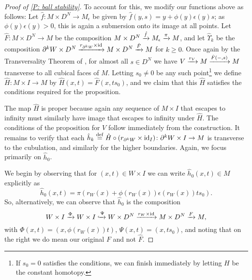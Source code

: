\begin{proof}[Proof of \cref{P: ball stability}]
	To account for this, we modify our functions above as follows: Let $\hat f \colon M \times D^N \to M_\epsilon$ be given by $\hat f(y, s) = y +\phi(y) \epsilon(y) s$; as $\phi(y)\epsilon(y)>0$, this is again a submersion onto its image at all points.
	Let $\hat F \colon M \times D^N \to M$ be the composition $M \times D^N \xrightarrow{\hat f}M_\epsilon \xrightarrow{\pi}M$, and let $\hat \Upsilon_k$ be the composition $\partial^kW \times D^N \xrightarrow{r_{\partial^kW} \times \mathrm{id}}M \times D^N \xrightarrow{\hat F} M$ for $k\geq 0$.
	Once again by the Transversality Theorem of \cite[Section 2.3]{GuPo74}, for almost all $s \in D^N$ we have $V \xrightarrow{r_V} M \xrightarrow{\hat F(-,s)} M$ transverse to all cubical faces of $M$.
	Letting $s_0 \neq 0$ be any such point\footnote{If $s_0 = 0$ satisfies the conditions, we can finish immediately by letting $H$ be the constant homotopy.} we define $\hat H \colon M \times I \to M$ by $\hat H(x,t) = \hat F(x,ts_0)$, and we claim that this $\hat H$ satisfies the conditions required for the proposition.

	The map $\hat H$ is proper because again any sequence of $M \times I$ that escapes to infinity must similarly have image that escapes to infinity under $\hat H$.
	The conditions of the proposition for $V$ follow immediately from the construction.
	It remains to verify that each $\hat h_k \stackrel{\mathrm{def}}{=} \hat H \circ (r_{\partial^k W} \times \mathrm{id}_I) \colon \partial^k W \times I \to M$ is transverse to the cubulation, and similarly for the higher boundaries.
	Again, we focus primarily on $\hat h_0$.

	\begin{comment}
	Note: we are not claiming an analogue of the third condition above holds for $\hat F$, nor do we need to.
	As we already know from the second condition of the proposition that $\hat h(-,1)$ is transverse to the cubulation and from the hypotheses that $\hat h(-,0)$ is transverse to the cubulation on $W$, it suffices to demonstrated transversality to the cubulation on the restriction of $\hat h$ to $W \times (0,1)$.
	\end{comment}

	We begin by observing that for $(x,t) \in W \times I$ we can write $\hat h_0(x,t) \in M$ explicitly as
	$$\hat h_0(x,t) = \pi(r_W(x)+\phi(r_W(x))\epsilon(r_W(x))ts_0).$$
	So, alternatively, we can observe that $\hat h_0$ is the composition
	\begin{equation}\label{E: alt hat h}
		W \times I \xrightarrow{\Phi} W \times I \xhookrightarrow{\Psi} W \times D^N \xrightarrow{r_W \times \mathrm{id}} M \times D^N \xrightarrow{F} M,
	\end{equation}
	with $\Phi(x,t) = (x,\phi(r_W(x))t)$, $\Psi(x,t) = (x,ts_0)$, and noting that on the right we do mean our original $F$ and not $\hat F$.


\end{proof}
